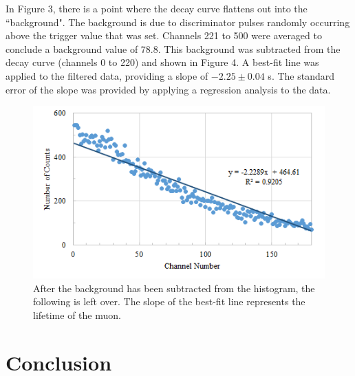 \documentclass[%
 aip,
 amsmath,amssymb,
 reprint,%
floatfix,
]{revtex4-1}
\begin{document}
In Figure 3, there is a point where the decay curve flattens out into the “background". The background is due to discriminator pulses randomly occurring above the trigger value that was set. Channels 221 to 500 were averaged to conclude a background value of 78.8. This background was subtracted from the decay curve (channels 0 to 220) and shown in Figure 4. A best-fit line was applied to the filtered data, providing a slope of $-2.25 \pm 0.04$ \textmu s. The standard error of the slope was provided by applying a regression analysis to the data.

\begin{figure}[H]
	\centering
	\includegraphics[scale=0.8]{filtered.png}
	\caption{After the background has been subtracted from the histogram, the following is left over. The slope of the best-fit line represents the lifetime of the muon.}
\end{figure}

\section{\label{sec:level5}Conclusion}


\nocite{*}
\end{document}
